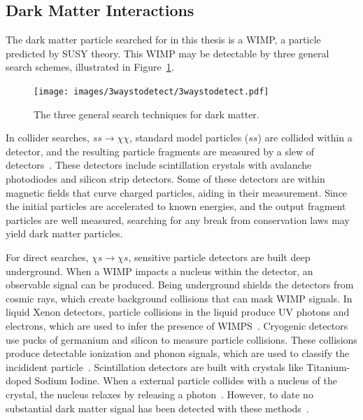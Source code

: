   \subsection{Dark Matter Interactions}\label{dmgammaproduction}
    
    The dark matter particle searched for in this thesis is a WIMP, a particle predicted by SUSY theory.
    This WIMP may be detectable by three general search schemes, illustrated in Figure~\ref{fig:3_searches}.

    \begin{figure}[ht]
      \centering
      \texttt{[image: images/3waystodetect/3waystodetect.pdf]}
      \caption[3 Search Techniques]{
        The three general search techniques for dark matter.}
      \label{fig:3_searches}
    \end{figure}
    
    In collider searches, $ss \rightarrow \chi\chi$, standard model particles ($ss$) are collided within a detector, and the resulting particle fragments are measured by a slew of detectors~\cite{atlas,cms}.
    These detectors include scintillation crystals with avalanche photodiodes and silicon strip detectors.
    Some of these detectors are within magnetic fields that curve charged particles, aiding in their measurement.
    Since the initial particles are accelerated to known energies, and the output fragment particles are well measured, searching for any break from conservation laws may yield dark matter particles. 
    
    For direct searches, $\chi s \rightarrow \chi s$, sensitive particle detectors are built deep underground.
    When a WIMP impacts a nucleus within the detector, an observable signal can be produced.
    Being underground shields the detectors from cosmic rays, which create background collisions that can mask WIMP signals.
    In liquid Xenon detectors, particle collisions in the liquid produce UV photons and electrons, which are used to infer the presence of WIMPS~\cite{direct_lux}.
    Cryogenic detectors use pucks of germanium and silicon to measure particle collisions.
    These collisions produce detectable ionization and phonon signals, which are used to classify the incidident particle~\cite{direct_cdms}.
    Scintillation detectors are built with crystals like Titanium-doped Sodium Iodine.
    When a external particle collides with a nucleus of the crystal, the nucleus relaxes by releasing a photon~\cite{direct_dama}.
    However, to date no substantial dark matter signal has been detected with these methods~\cite{direct_dm_detection}.
    
